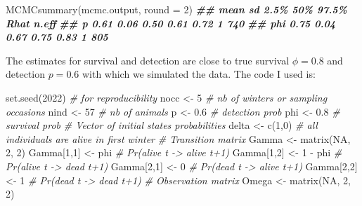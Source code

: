\documentclass[
  12pt,
]{krantz}
\newenvironment{Shaded}{\begin{snugshade}}{\end{snugshade}}
\newcommand{\AttributeTok}[1]{\textcolor[rgb]{0.77,0.63,0.00}{#1}}
\newcommand{\CommentTok}[1]{\textcolor[rgb]{0.56,0.35,0.01}{\textit{#1}}}
\newcommand{\ConstantTok}[1]{\textcolor[rgb]{0.00,0.00,0.00}{#1}}
\newcommand{\DecValTok}[1]{\textcolor[rgb]{0.00,0.00,0.81}{#1}}
\newcommand{\DocumentationTok}[1]{\textcolor[rgb]{0.56,0.35,0.01}{\textbf{\textit{#1}}}}
\newcommand{\FloatTok}[1]{\textcolor[rgb]{0.00,0.00,0.81}{#1}}
\newcommand{\FunctionTok}[1]{\textcolor[rgb]{0.00,0.00,0.00}{#1}}
\newcommand{\NormalTok}[1]{#1}
\newcommand{\OtherTok}[1]{\textcolor[rgb]{0.56,0.35,0.01}{#1}}
\newcommand{\SpecialCharTok}[1]{\textcolor[rgb]{0.00,0.00,0.00}{#1}}
\begin{document}
\begin{Shaded}
\begin{Highlighting}[]
\FunctionTok{MCMCsummary}\NormalTok{(mcmc.output, }\AttributeTok{round =} \DecValTok{2}\NormalTok{)}
\DocumentationTok{\#\#     mean   sd 2.5\%  50\% 97.5\% Rhat n.eff}
\DocumentationTok{\#\# p   0.61 0.06 0.50 0.61  0.72    1   740}
\DocumentationTok{\#\# phi 0.75 0.04 0.67 0.75  0.83    1   805}
\end{Highlighting}
\end{Shaded}

The estimates for survival and detection are close to true survival \(\phi = 0.8\) and detection \(p = 0.6\) with which we simulated the data. The code I used is:

\begin{Shaded}
\begin{Highlighting}[]
\FunctionTok{set.seed}\NormalTok{(}\DecValTok{2022}\NormalTok{) }\CommentTok{\# for reproducibility}
\NormalTok{nocc }\OtherTok{\textless{}{-}} \DecValTok{5} \CommentTok{\# nb of winters or sampling occasions}
\NormalTok{nind }\OtherTok{\textless{}{-}} \DecValTok{57} \CommentTok{\# nb of animals}
\NormalTok{p }\OtherTok{\textless{}{-}} \FloatTok{0.6} \CommentTok{\# detection prob}
\NormalTok{phi }\OtherTok{\textless{}{-}} \FloatTok{0.8} \CommentTok{\# survival prob}
\CommentTok{\# Vector of initial states probabilities}
\NormalTok{delta }\OtherTok{\textless{}{-}} \FunctionTok{c}\NormalTok{(}\DecValTok{1}\NormalTok{,}\DecValTok{0}\NormalTok{) }\CommentTok{\# all individuals are alive in first winter}
\CommentTok{\# Transition matrix}
\NormalTok{Gamma }\OtherTok{\textless{}{-}} \FunctionTok{matrix}\NormalTok{(}\ConstantTok{NA}\NormalTok{, }\DecValTok{2}\NormalTok{, }\DecValTok{2}\NormalTok{)}
\NormalTok{Gamma[}\DecValTok{1}\NormalTok{,}\DecValTok{1}\NormalTok{] }\OtherTok{\textless{}{-}}\NormalTok{ phi      }\CommentTok{\# Pr(alive t {-}\textgreater{} alive t+1)}
\NormalTok{Gamma[}\DecValTok{1}\NormalTok{,}\DecValTok{2}\NormalTok{] }\OtherTok{\textless{}{-}} \DecValTok{1} \SpecialCharTok{{-}}\NormalTok{ phi  }\CommentTok{\# Pr(alive t {-}\textgreater{} dead t+1)}
\NormalTok{Gamma[}\DecValTok{2}\NormalTok{,}\DecValTok{1}\NormalTok{] }\OtherTok{\textless{}{-}} \DecValTok{0}        \CommentTok{\# Pr(dead t {-}\textgreater{} alive t+1)}
\NormalTok{Gamma[}\DecValTok{2}\NormalTok{,}\DecValTok{2}\NormalTok{] }\OtherTok{\textless{}{-}} \DecValTok{1}        \CommentTok{\# Pr(dead t {-}\textgreater{} dead t+1)}
\CommentTok{\# Observation matrix }
\NormalTok{Omega }\OtherTok{\textless{}{-}} \FunctionTok{matrix}\NormalTok{(}\ConstantTok{NA}\NormalTok{, }\DecValTok{2}\NormalTok{, }\DecValTok{2}\NormalTok{)}

\end{Highlighting}
\end{Shaded}
\end{document}
